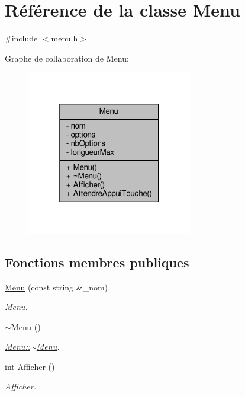 \hypertarget{class_menu}{}\section{Référence de la classe Menu}
\label{class_menu}


{\ttfamily \#include $<$menu.\+h$>$}



Graphe de collaboration de Menu\+:
\nopagebreak
\begin{figure}[H]
\begin{center}
\leavevmode
\includegraphics[width=205pt]{class_menu__coll__graph}
\end{center}
\end{figure}
\subsection*{Fonctions membres publiques}
\begin{DoxyCompactItemize}
\item 
\hyperlink{class_menu_a2733b73d7c4dff4b1db19afd45f255b9}{Menu} (const string \&\+\_\+nom)
\begin{DoxyCompactList}\small\item\em \hyperlink{class_menu}{Menu}. \end{DoxyCompactList}\item 
\hyperlink{class_menu_a831387f51358cfb88cd018e1777bc980}{$\sim$\+Menu} ()
\begin{DoxyCompactList}\small\item\em \hyperlink{class_menu_a831387f51358cfb88cd018e1777bc980}{Menu\+::$\sim$\+Menu}. \end{DoxyCompactList}\item 
int \hyperlink{class_menu_a079e0c6a24248a07993b48b310ba65ce}{Afficher} ()
\begin{DoxyCompactList}\small\item\em Afficher. \end{DoxyCompactList}\end{DoxyCompactItemize}

